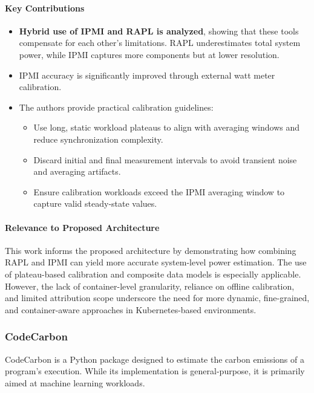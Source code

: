 \paragraph{Key Contributions}
\begin{itemize}
    \item \textbf{Hybrid use of IPMI and RAPL is analyzed}, showing that these tools compensate for each other’s limitations. RAPL underestimates total system power, while IPMI captures more components but at lower resolution.
    \item IPMI accuracy is significantly improved through external watt meter calibration.
    \item The authors provide practical calibration guidelines:
    \begin{itemize}
        \item Use long, static workload plateaus to align with averaging windows and reduce synchronization complexity.
        \item Discard initial and final measurement intervals to avoid transient noise and averaging artifacts.
        \item Ensure calibration workloads exceed the IPMI averaging window to capture valid steady-state values.
    \end{itemize}
\end{itemize}

\paragraph{Relevance to Proposed Architecture}
This work informs the proposed architecture by demonstrating how combining RAPL and IPMI can yield more accurate system-level power estimation. The use of plateau-based calibration and composite data models is especially applicable. However, the lack of container-level granularity, reliance on offline calibration, and limited attribution scope underscore the need for more dynamic, fine-grained, and container-aware approaches in Kubernetes-based environments.

\subsubsection{CodeCarbon}
CodeCarbon\parencite{codecarbon_2024} is a Python package designed to estimate the carbon emissions of a program’s execution. While its implementation is general-purpose, it is primarily aimed at machine learning workloads.

